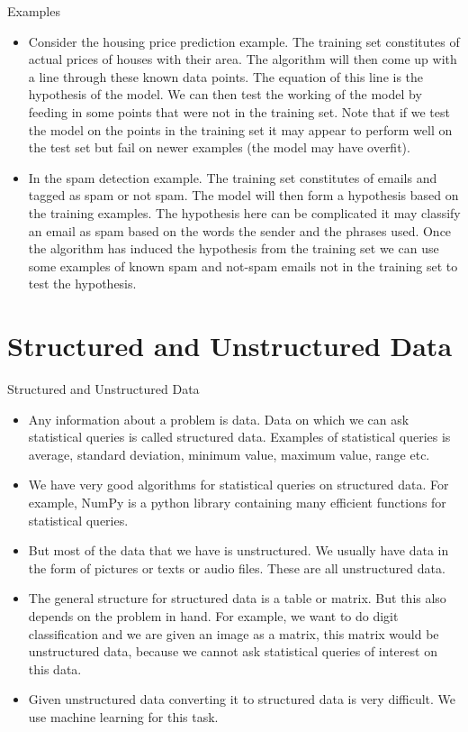 \documentclass[11pt,notheorems,hyperref={pdfauthor=whatever}]{beamer}
\begin{document}
\begin{frame}{Examples}
\begin{itemize}
    \item Consider the housing price prediction example. The training set constitutes of actual prices of houses with their area. The algorithm will then come up with a line through these known data points. The equation of this line is the hypothesis of the model. We can then test the working of the model by feeding in some points that were not in the training set. Note that if we test the model on the points in the training set it may appear to perform well on the test set but fail on newer examples (the model may have overfit).
    \item In the spam detection example. The training set constitutes of emails and tagged as spam or not spam. The model will then form a hypothesis based on the training examples. The hypothesis here can be complicated it may classify an email as spam based on the words the sender and the phrases used. Once the algorithm has induced the hypothesis from the training set we can use some examples of known spam and not-spam emails not in the training set to test the hypothesis.
\end{itemize}
\end{frame}


\section{Structured and Unstructured Data}

\begin{frame}{Structured and Unstructured Data}
    \begin{itemize}
        \item Any information about a problem is data. Data on which we can ask statistical queries is called structured data. Examples of statistical queries is average, standard deviation, minimum value, maximum value, range etc.
        \item We have very good algorithms for statistical queries on structured data. For example, NumPy is a python library containing many efficient functions for statistical queries.
        \item But most of the data that we have is unstructured. We usually have data in the form of pictures or texts or audio files. These are all unstructured data. 
        \item The general structure for structured data is a table or matrix. But this also depends on the problem in hand. For example, we want to do digit classification and we are given an image as a matrix, this matrix would be unstructured data, because we cannot ask statistical queries of interest on this data.
        \item Given unstructured data converting it to structured data is very difficult. We use machine learning for this task.
    \end{itemize}
\end{frame}
\end{document}
